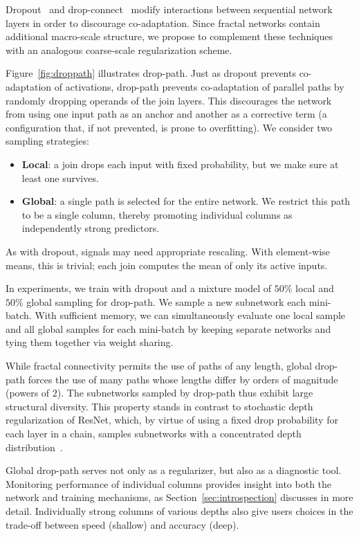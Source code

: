 \documentclass{article}
\newcommand{\resnet}{ResNet}
\newcommand{\dropout}{dropout}
\newcommand{\dropconn}{drop-connect}
\newcommand{\droppath}{drop-path}
\newcommand{\Dropout}{Dropout}
\begin{document}
{\Dropout}~\citep{dropout} and {\dropconn}~\citep{dropconnect} modify
interactions between sequential network layers in order to discourage
co-adaptation.  Since fractal networks contain additional macro-scale
structure, we propose to complement these techniques with an analogous
coarse-scale regularization scheme.

Figure~\ref{fig:droppath} illustrates {\droppath}.  Just as {\dropout} prevents
co-adaptation of activations, {\droppath} prevents co-adaptation of parallel
paths by randomly dropping operands of the $\mathrm{join}$ layers.  This
discourages the network from using one input path as an anchor and another as a
corrective term (a configuration that, if not prevented, is prone to
overfitting).  We consider two sampling strategies:
\begin{itemize}
   \item{
      \textbf{Local}: a $\mathrm{join}$ drops each input with fixed
      probability, but we make sure at least one survives.
   }
   \item{
      \textbf{Global}: a single path is selected for the entire network.
      We restrict this path to be a single column, thereby promoting
      individual columns as independently strong predictors.
   }
\end{itemize}
As with {\dropout}, signals may need appropriate rescaling.  With element-wise
means, this is trivial; each $\mathrm{join}$ computes the mean of only its
active inputs.

In experiments, we train with {\dropout} and a mixture model of $50\%$ local
and $50\%$ global sampling for {\droppath}.  We sample a new subnetwork each
mini-batch.  With sufficient memory, we can simultaneously evaluate one local
sample and all global samples for each mini-batch by keeping separate
networks and tying them together via weight sharing.

While fractal connectivity permits the use of paths of any length, global
{\droppath} forces the use of many paths whose lengths differ by orders of
magnitude (powers of $2$).  The subnetworks sampled by {\droppath} thus exhibit
large structural diversity.  This property stands in contrast to stochastic
depth regularization of {\resnet}, which, by virtue of using a fixed drop
probability for each layer in a chain, samples subnetworks with a concentrated
depth distribution~\citep{huang2016stochasticdepth}.

Global {\droppath} serves not only as a regularizer, but also as a diagnostic
tool.  Monitoring performance of individual columns provides insight into both
the network and training mechanisms, as Section~\ref{sec:introspection}
discusses in more detail.  Individually strong columns of various depths also
give users choices in the trade-off between speed (shallow) and accuracy
(deep).
\end{document}
